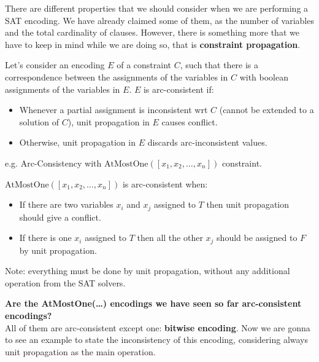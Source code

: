 There are different properties that we should consider when we are performing a SAT encoding. We have already claimed some of them, as the number of 
variables and the total cardinality of clauses. However, there is something more that we have to keep in mind while we are doing so, that is 
\textbf{constraint propagation}. \vspace{7pt}

Let's consider an encoding $E$ of a constraint $C$, such that there is a correspondence between the assignments of the variables in $C$ with boolean
assignments of the variables in $E$. $E$ is arc-consistent if:
\begin{itemize}
    \renewcommand{\labelitemi}{-}
    \item Whenever a partial assignment is inconsistent wrt $C$ (cannot be extended to a solution of $C$), unit propagation in $E$ causes conflict.
    \item Otherwise, unit propagation in $E$ discards arc-inconsistent values.
\end{itemize}
\begin{example}
    e.g. Arc-Consistency with $\text{AtMostOne}([x_1, x_2, \dots, x_n])$ constraint. \vspace{7pt}

    $\text{AtMostOne}([x_1, x_2, \dots, x_n])$ is arc-consistent when:
    \begin{itemize}
        \renewcommand{\labelitemi}{-}
        \item If there are two variables $x_i$ and $x_j$ assigned to $T$ then unit propagation should give a conflict.
        \item If there is one $x_i$ assigned to $T$ then all the other $x_j$ should be assigned to $F$ by unit propagation.
    \end{itemize} \vspace{7pt}

    Note: everything must be done by unit propagation, without any additional operation from the SAT solvers.
\end{example} \vspace{3.5pt}

\textbf{Are the AtMostOne(\dots) encodings we have seen so far arc-consistent encodings?} \\ 
All of them are arc-consistent except one: \textbf{bitwise encoding}. Now we are gonna to see an example to state the inconsistency of this encoding, considering
always unit propagation as the main operation.
